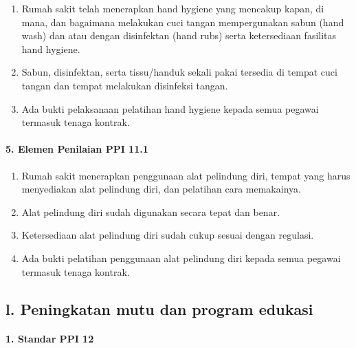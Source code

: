 \documentclass[
]{book}
\providecommand{\tightlist}{%
  \setlength{\itemsep}{0pt}\setlength{\parskip}{0pt}}
\begin{document}
\begin{enumerate}
\def\labelenumi{\alph{enumi}.}
\tightlist
\item
  Rumah sakit telah menerapkan hand hygiene yang mencakup kapan, di mana, dan bagaimana melakukan cuci tangan mempergunakan sabun (hand wash) dan atau dengan disinfektan (hand rubs) serta ketersediaan fasilitas hand hygiene.
\item
  Sabun, disinfektan, serta tissu/handuk sekali pakai tersedia di tempat cuci tangan dan tempat melakukan disinfeksi tangan.
\item
  Ada bukti pelaksanaan pelatihan hand hygiene kepada semua pegawai termasuk tenaga kontrak.
\end{enumerate}

\hypertarget{elemen-penilaian-ppi-11.1}{%
\paragraph*{5. Elemen Penilaian PPI 11.1}\label{elemen-penilaian-ppi-11.1}}

\begin{enumerate}
\def\labelenumi{\alph{enumi}.}
\tightlist
\item
  Rumah sakit menerapkan penggunaan alat pelindung diri, tempat yang harus menyediakan alat pelindung diri, dan pelatihan cara memakainya.
\item
  Alat pelindung diri sudah digunakan secara tepat dan benar.
\item
  Ketersediaan alat pelindung diri sudah cukup sesuai dengan regulasi.
\item
  Ada bukti pelatihan penggunaan alat pelindung diri kepada semua pegawai termasuk tenaga kontrak.
\end{enumerate}

\hypertarget{l.-peningkatan-mutu-dan-program-edukasi}{%
\subsection*{l. Peningkatan mutu dan program edukasi}\label{l.-peningkatan-mutu-dan-program-edukasi}}

\hypertarget{standar-ppi-12}{%
\paragraph*{1. Standar PPI 12}\label{standar-ppi-12}}
\end{document}
